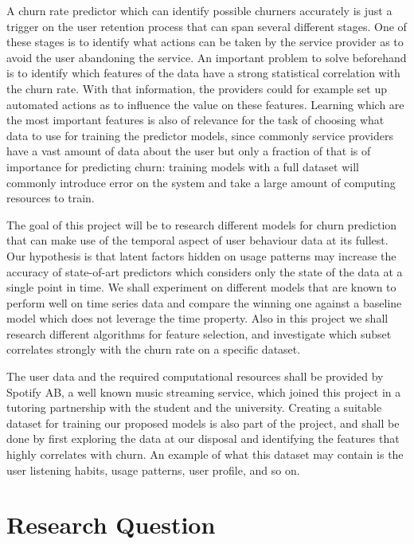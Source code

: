 \documentclass{kththesis}
\begin{document}
    A churn rate predictor which can identify possible churners accurately is just a trigger on the user retention process that can span several different stages. One of these stages is to identify what actions can be taken by the service provider as to avoid the user abandoning the service. An important problem to solve beforehand is to identify which features of the data have a strong statistical correlation with the churn rate. With that information, the providers could for example set up automated actions as to influence the value on these features. Learning which are the most important features is also of relevance for the task of choosing what data to use for training the predictor models, since commonly service providers have a vast amount of data about the user but only a fraction of that is of importance for predicting churn: training models with a full dataset will commonly introduce error on the system and take a large amount of computing resources to train.
    
    The goal of this project will be to research different models for churn prediction that can make use of the temporal aspect of user behaviour data at its fullest. Our hypothesis is that latent factors hidden on usage patterns may increase the accuracy of state-of-art predictors which considers only the state of the data at a single point in time. We shall experiment on different models that are known to perform well on time series data and compare the winning one against a baseline model which does not leverage the time property. Also in this project we shall research different algorithms for feature selection, and investigate which subset correlates strongly with the churn rate on a specific dataset.
    
    The user data and the required computational resources shall be provided by Spotify AB, a well known music streaming service, which joined this project in a tutoring partnership with the student and the university. Creating a suitable dataset for training our proposed models is also part of the project, and shall be done by first exploring the data at our disposal and identifying the features that highly correlates with churn. An example of what this dataset may contain is the user listening habits, usage patterns, user profile, and so on.

\section{Research Question}
        
\end{document}
